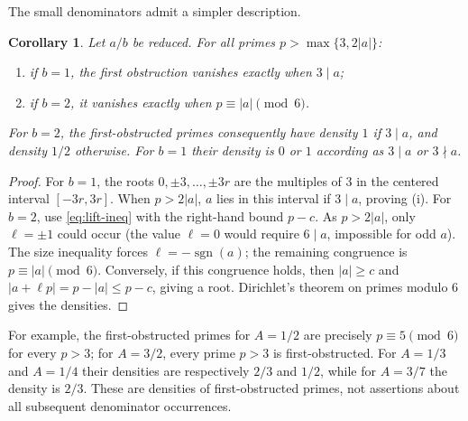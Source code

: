 \documentclass[11pt,a4paper,reqno]{amsart}
\newtheorem{corollary}[theorem]{Corollary}
\theoremstyle{definition}
\theoremstyle{remark}
\begin{document}
The small denominators admit a simpler description.
\begin{corollary}\label{cor:small-b}
Let $a/b$ be reduced.  For all primes $p>\max\{3,2|a|\}$:
\begin{enumerate}[label=(\roman*)]
\item if $b=1$, the first obstruction vanishes exactly when $3\mid a$;
\item if $b=2$, it vanishes exactly when $p\equiv|a|\pmod6$.
\end{enumerate}
For $b=2$, the first-obstructed primes consequently have density
$1$ if $3\mid a$, and density $1/2$ otherwise.  For $b=1$ their
density is $0$ or $1$ according as $3\mid a$ or $3\nmid a$.
\end{corollary}

\begin{proof}
For $b=1$, the roots $0,\pm3,\ldots,\pm3r$ are the multiples
of $3$ in the centered interval $[-3r,3r]$.  When $p>2|a|$,
$a$ lies in this interval if $3\mid a$, proving (i).
For $b=2$, use \eqref{eq:lift-ineq} with the right-hand bound
$p-c$.  As $p>2|a|$, only $\ell=\pm1$ could occur (the value
$\ell=0$ would require $6\mid a$, impossible for odd $a$).
The size inequality forces $\ell=-\operatorname{sgn}(a)$;
the remaining congruence is $p\equiv|a|\pmod6$.
Conversely, if this congruence holds, then $|a|\ge c$ and
$|a+\ell p|=p-|a|\le p-c$, giving a root.  Dirichlet's
theorem on primes modulo $6$ gives the densities.
\end{proof}

For example, the first-obstructed primes for $A=1/2$ are
precisely $p\equiv5\pmod6$ for every $p>3$; for $A=3/2$,
every prime $p>3$ is first-obstructed.  For $A=1/3$ and $A=1/4$
their densities are respectively $2/3$ and $1/2$, while for
$A=3/7$ the density is $2/3$.  These are densities of first-obstructed
primes, not assertions about all subsequent denominator occurrences.
\end{document}
